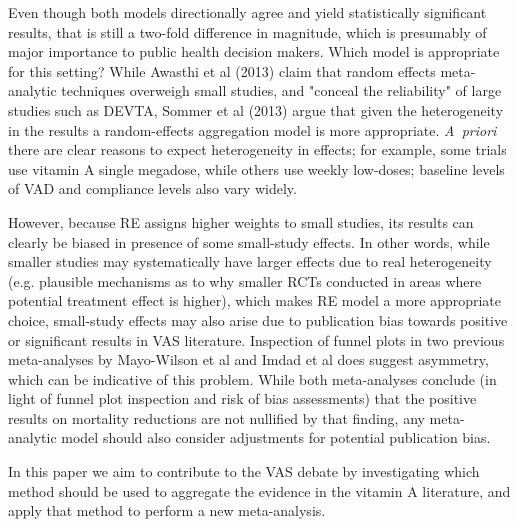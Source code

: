 \documentclass[12pt]{article}
\begin{document}
Even though both models directionally agree and yield statistically significant results, that is still a two-fold difference in magnitude, which is presumably of major importance to public health decision makers. Which model is appropriate for this setting? While Awasthi et al (2013) claim that random effects meta-analytic techniques overweigh small studies, and "conceal the reliability" of large studies such as DEVTA, Sommer et al (2013) argue that given the heterogeneity in the results a random-effects aggregation model is more appropriate. \emph{A~priori} there are clear reasons to expect heterogeneity in effects; for example, some trials use vitamin A single megadose, while others use weekly low-doses; baseline levels of VAD and compliance levels also vary widely.


However, because RE assigns higher weights to small studies, its results can clearly be biased in presence of some small-study effects. In other words, while smaller studies may systematically have larger effects due to real heterogeneity (e.g. plausible mechanisms as to why smaller RCTs conducted in areas where potential treatment effect is higher), which makes RE model a more appropriate choice, small-study effects may also arise due to publication bias towards positive or significant results in VAS literature. Inspection of funnel plots in two previous meta-analyses by Mayo-Wilson et al and Imdad et al does suggest asymmetry, which can be indicative of this problem. While both meta-analyses conclude (in light of funnel plot inspection and risk of bias assessments) that the positive results on mortality reductions are not nullified by that finding, any meta-analytic model should also consider adjustments for potential publication bias.

In this paper we aim to contribute to the VAS debate by investigating which method should be used to aggregate the evidence in the vitamin A literature, and apply that method to perform a new meta-analysis. 
\end{document}

